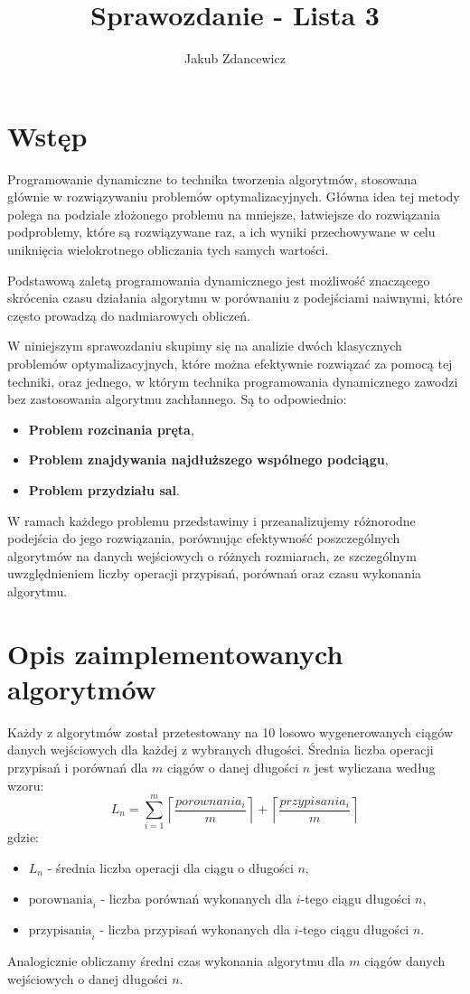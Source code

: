 \documentclass{article}
\title{Sprawozdanie - Lista 3}
\author{Jakub Zdancewicz}
\date{}
\begin{document}
\maketitle

\tableofcontents
\newpage

\section{Wstęp}
Programowanie dynamiczne to technika tworzenia algorytmów, stosowana głównie w rozwiązywaniu problemów optymalizacyjnych. Główna idea tej metody polega na podziale złożonego problemu na mniejsze, łatwiejsze do rozwiązania podproblemy, które są rozwiązywane raz, a ich wyniki przechowywane w celu uniknięcia wielokrotnego obliczania tych samych wartości. 

Podstawową zaletą programowania dynamicznego jest możliwość znaczącego skrócenia czasu działania algorytmu w porównaniu z podejściami naiwnymi, które często prowadzą do nadmiarowych obliczeń.

W niniejszym sprawozdaniu skupimy się na analizie dwóch klasycznych problemów optymalizacyjnych, które można efektywnie rozwiązać za pomocą tej techniki, oraz jednego, w którym technika programowania dynamicznego zawodzi bez zastosowania algorytmu zachłannego. Są to odpowiednio:
\begin{itemize}
    \item \textbf{Problem rozcinania pręta},
    \item \textbf{Problem znajdywania najdłuższego wspólnego podciągu},
    \item \textbf{Problem przydziału sal}.
\end{itemize}

W ramach każdego problemu przedstawimy i przeanalizujemy różnorodne podejścia do jego rozwiązania, porównując efektywność poszczególnych algorytmów na danych wejściowych o różnych rozmiarach, ze szczególnym uwzględnieniem liczby operacji przypisań, porównań oraz czasu wykonania algorytmu.
\section{Opis zaimplementowanych algorytmów}
Każdy z algorytmów został przetestowany na 10 losowo wygenerowanych ciągów danych wejściowych dla każdej z wybranych długości. Średnia liczba operacji przypisań i porównań dla $m$ ciągów o danej długości $n$ jest wyliczana według wzoru:
\[
    L_n = \sum_{i=1}^{m} \left\lceil\frac{porownania_i}{m}\right\rceil + \left\lceil\frac{przypisania_i}{m}\right\rceil
\]
gdzie:
\begin{itemize}
    \item[] $L_n$ - średnia liczba operacji dla ciągu o długości $n$,
    \item[] $\text{porownania}_i$ - liczba porównań wykonanych dla $i$-tego ciągu długości $n$,
    \item[] $\text{przypisania}_i$ - liczba przypisań wykonanych dla $i$-tego ciągu długości $n$.
\end{itemize}
Analogicznie obliczamy średni czas wykonania algorytmu dla $m$ ciągów danych wejściowych o danej długości $n$.
\end{document}
